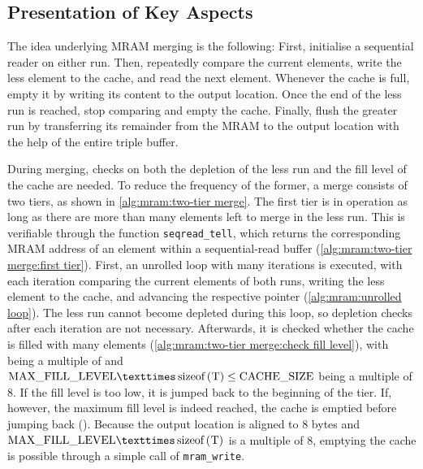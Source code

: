 \subsection{Presentation of Key Aspects}
\label{sec:mram:merge:presentation}

The idea underlying \ac{MRAM} merging is the following:
First, initialise a sequential reader on either run.
Then, repeatedly compare the current elements, write the less element to the cache, and read the next element.
Whenever the cache is full, empty it by writing its content to the output location.
Once the end of the less run is reached, stop comparing and empty the cache.
Finally, flush the greater run by transferring its remainder from the \ac{MRAM} to the output location with the help of the entire triple buffer.

During merging, checks on both the depletion of the less run and the fill level of the cache are needed.
To reduce the frequency of the former, a merge consists of two tiers, as shown in \cref{alg:mram:two-tier merge}.
The first tier is in operation as long as there are more than \unrollfactor{} many elements left to merge in the less run.
This is verifiable through the function \lstinline|seqread_tell|, which returns the corresponding \ac{MRAM} address of an element within a sequential-read buffer (\cref{alg:mram:two-tier merge:first tier}).
First, an unrolled loop with \unrollfactor{} many iterations is executed, with each iteration comparing the current elements of both runs, writing the less element to the cache, and advancing the respective pointer (\cref{alg:mram:unrolled loop}).
The less run cannot become depleted during this loop, so depletion checks after each iteration are not necessary.
Afterwards, it is checked whether the cache is filled with \unrolledcachelength{} many elements (\cref{alg:mram:two-tier merge:check fill level}), with \unrolledcachelength{} being a multiple of \unrollfactor{} and \(\unrolledcachelength{} × \text{\lstinline[keywords={}]|sizeof(T)|} \le \cachesize{}\) being a multiple of 8.
If the fill level is too low, it is jumped back to the beginning of the tier.
If, however, the maximum fill level is indeed reached, the cache is emptied before jumping back ().
Because the output location is aligned to 8 bytes and \(\unrolledcachelength{} × \text{\lstinline[keywords={}]|sizeof(T)|}\) is a multiple of 8, emptying the cache is possible through a simple call of \lstinline|mram_write|.

